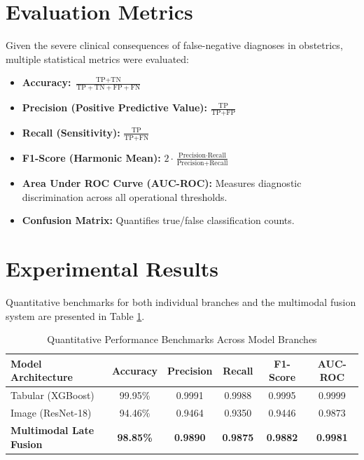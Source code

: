 \documentclass[journal,10pt,twocolumn]{IEEEtran}
\begin{document}
\section{Evaluation Metrics}
Given the severe clinical consequences of false-negative diagnoses in obstetrics, multiple statistical metrics were evaluated:
\begin{itemize}
    \item \textbf{Accuracy:} $\frac{\text{TP} + \text{TN}}{\text{TP} + \text{TN} + \text{FP} + \text{FN}}$
    \item \textbf{Precision (Positive Predictive Value):} $\frac{\text{TP}}{\text{TP} + \text{FP}}$
    \item \textbf{Recall (Sensitivity):} $\frac{\text{TP}}{\text{TP} + \text{FN}}$
    \item \textbf{F1-Score (Harmonic Mean):} $2 \cdot \frac{\text{Precision} \cdot \text{Recall}}{\text{Precision} + \text{Recall}}$
    \item \textbf{Area Under ROC Curve (AUC-ROC):} Measures diagnostic discrimination across all operational thresholds.
    \item \textbf{Confusion Matrix:} Quantifies true/false classification counts.
\end{itemize}

\section{Experimental Results}
Quantitative benchmarks for both individual branches and the multimodal fusion system are presented in Table \ref{tab:experimental_results}.

\begin{table}[t]
\centering
\caption{Quantitative Performance Benchmarks Across Model Branches}
\label{tab:experimental_results}
\renewcommand{\arraystretch}{1.2}
\begin{tabular}{lccccc}
\toprule
\textbf{Model Architecture} & \textbf{Accuracy} & \textbf{Precision} & \textbf{Recall} & \textbf{F1-Score} & \textbf{AUC-ROC} \\
\midrule
Tabular (XGBoost) & 99.95\% & 0.9991 & 0.9988 & 0.9995 & 0.9999 \\
Image (ResNet-18) & 94.46\% & 0.9464 & 0.9350 & 0.9446 & 0.9873 \\
\textbf{Multimodal Late Fusion} & \textbf{98.85\%} & \textbf{0.9890} & \textbf{0.9875} & \textbf{0.9882} & \textbf{0.9981} \\
\bottomrule
\end{tabular}
\end{table}
\end{document}
